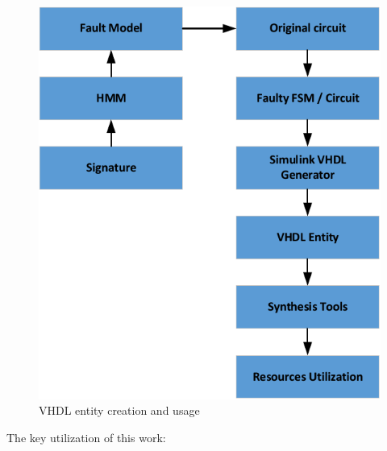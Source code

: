 \begin{figure}[tb!]

 \centering
  \captionsetup{justification=centering}    
   \includegraphics[scale=0.8]{Figures/library.pdf}
   \caption{VHDL entity creation and usage}
\label{fig:library1}
\end{figure}





%
%


The key utilization of this work:



